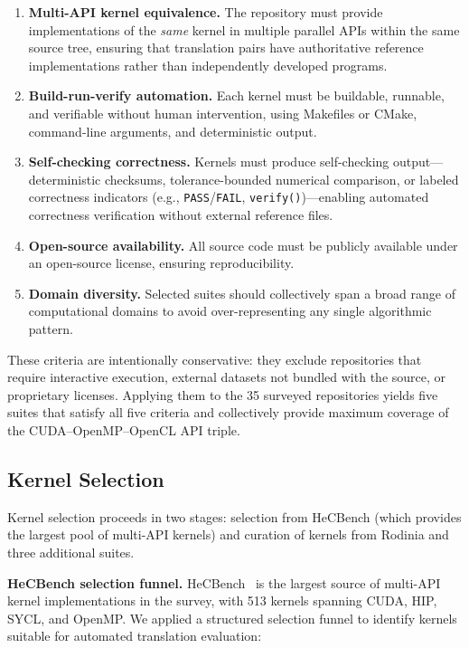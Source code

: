 \documentclass[conference]{IEEEtran}
\begin{document}
\begin{enumerate}
\item \textbf{Multi-API kernel equivalence.} The repository must provide implementations of the \emph{same} kernel in multiple parallel APIs within the same source tree, ensuring that translation pairs have authoritative reference implementations rather than independently developed programs.
\item \textbf{Build-run-verify automation.} Each kernel must be buildable, runnable, and verifiable without human intervention, using Makefiles or CMake, command-line arguments, and deterministic output.
\item \textbf{Self-checking correctness.} Kernels must produce self-checking output---deterministic checksums, tolerance-bounded numerical comparison, or labeled correctness indicators (e.g., \texttt{PASS}/\texttt{FAIL}, \texttt{verify()})---enabling automated correctness verification without external reference files.
\item \textbf{Open-source availability.} All source code must be publicly available under an open-source license, ensuring reproducibility.
\item \textbf{Domain diversity.} Selected suites should collectively span a broad range of computational domains to avoid over-representing any single algorithmic pattern.
\end{enumerate}

These criteria are intentionally conservative: they exclude repositories that require interactive execution, external datasets not bundled with the source, or proprietary licenses. Applying them to the 35 surveyed repositories yields five suites that satisfy all five criteria and collectively provide maximum coverage of the CUDA--OpenMP--OpenCL API triple.

\subsection{Kernel Selection}
\label{sec:kernel-selection}

Kernel selection proceeds in two stages: selection from HeCBench (which provides the largest pool of multi-API kernels) and curation of kernels from Rodinia and three additional suites.

\textbf{HeCBench selection funnel.} HeCBench~\cite{HeCBench2023} is the largest source of multi-API kernel implementations in the survey, with 513 kernels spanning CUDA, HIP, SYCL, and OpenMP. We applied a structured selection funnel to identify kernels suitable for automated translation evaluation:
\end{document}
